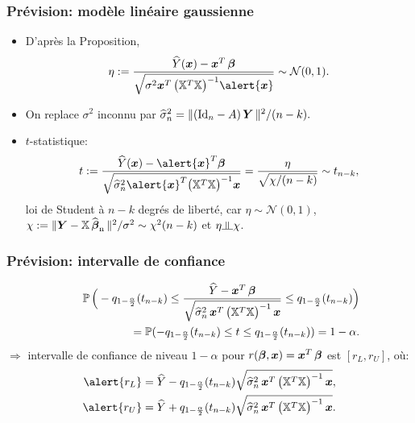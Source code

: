 \begin{frame}
\frametitle{Prévision: modèle linéaire gaussienne}
\begin{itemize}
\item D'après la Proposition,
$$
\eta:=\frac{\widehat{Y}(\bx) - \bx^T\truebeta}{\sqrt{\sigma^2 {\bx^T\big(\regressmat^T\regressmat\big)^{-1}\alert{\bx}}}}
\sim {\mathcal N}(0,1).
$$
\item On replace $\sigma^2$ inconnu par $\widehat \sigma_n^2 =
{\|(\mathrm{Id}_{n}-A) \operatorname{\boldsymbol{Y}} \|^2}/({n-k}).$
\item \alert{$t$-statistique:}
$$
t:= \frac{\widehat{Y}(\bx) -\alert{\bx}^T\truebeta}{\sqrt{\widehat
\sigma_n^2 \alert{\bx}^T\big(\regressmat^T\regressmat\big)^{-1}{
\bx}}}=\frac{\eta}{\sqrt{\chi/(n-k)}}\sim t_{n-k},
$$
\alert{loi de Student à $n-k$ degrés de liberté}, car $\eta\sim
{\mathcal N}(0,1)$, $\chi:=\|\boldsymbol{Y}-\mathbb{X}
\operatorname{\widehat{\boldsymbol{\beta}}_n}\|^2/\sigma^2\sim \chi^2(n-k)$ et $\eta \indep \chi$.
\end{itemize}
\end{frame}

\begin{frame}
\frametitle{Prévision: intervalle de confiance}
\begin{eqnarray*}
&&\operatorname{{\mathbb P}} \Big(-q_{1-\frac{\alpha}{2}}(t_{n-k}) \le \frac{\widehat Y
- \operatorname{\boldsymbol{x}}^T\boldsymbol{\beta}} {\sqrt{\widehat \sigma_n^2  \operatorname{\boldsymbol{x}}^T\big(\mathbb{X}^T\mathbb{X}\big)^{-1} \operatorname{\boldsymbol{x}} }}\le
q_{1-\frac{\alpha}{2}}(t_{n-k})\Big) \\\hspace{4mm} &&= \operatorname{{\mathbb P}}(-
q_{1-\frac{\alpha}{2}}(t_{n-k}) \le t\le
q_{1-\frac{\alpha}{2}}(t_{n-k})) = 1-\alpha.
\end{eqnarray*}
$\Longrightarrow$ \alert{intervalle de confiance} de niveau
$1-\alpha$ pour $r(\boldsymbol{\beta},\operatorname{\boldsymbol{x}})=\operatorname{\boldsymbol{x}}^T\boldsymbol{\beta}$ est
\alert{$[r_L, r_U]$}, o\`u:
\begin{align*}
\alert{r_L}&=\widehat Y -
q_{1-\frac{\alpha}{2}}(t_{n-k})\sqrt{\widehat \sigma_n^2
\bx^T\big(\regressmat^T\regressmat\big)^{-1}\bx},\\
\alert{r_U}&= \widehat Y +
q_{1-\frac{\alpha}{2}}(t_{n-k})\sqrt{\widehat \sigma_n^2 \bx^T\big(\regressmat^T\regressmat\big)^{-1} \bx}.
\end{align*}
\end{frame}



